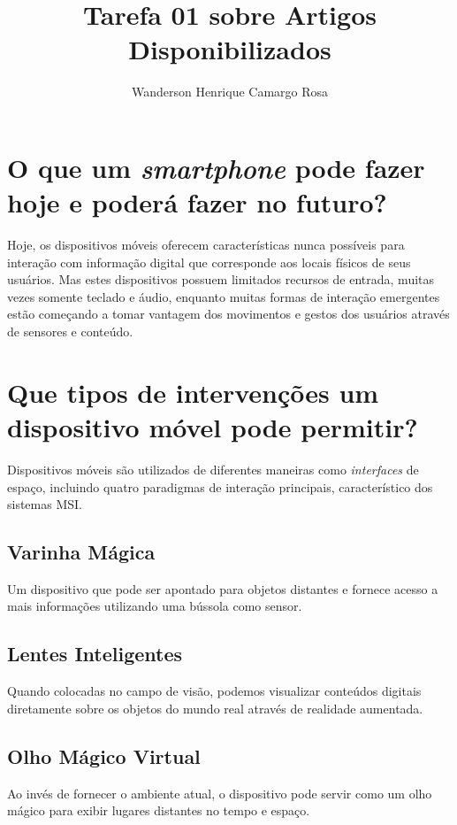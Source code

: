 \documentclass{article}
\title{Tarefa 01 sobre Artigos Disponibilizados}
\author{Wanderson Henrique Camargo Rosa\inst{1}}
\begin{document}
\maketitle{}

\section{O que um \emph{smartphone} pode fazer hoje e poderá fazer no futuro?}

Hoje, os dispositivos móveis oferecem características nunca possíveis para
interação com informação digital que corresponde aos locais físicos de seus
usuários. Mas estes dispositivos possuem limitados recursos de entrada, muitas
vezes somente teclado e áudio, enquanto muitas formas de interação emergentes
estão começando a tomar vantagem dos movimentos e gestos dos usuários através de
sensores e conteúdo.

\section{Que tipos de intervenções um dispositivo móvel pode permitir?}

Dispositivos móveis são utilizados de diferentes maneiras como \emph{interfaces}
de espaço, incluindo quatro paradigmas de interação principais, característico
dos sistemas MSI.

\subsection{Varinha Mágica}

Um dispositivo que pode ser apontado para objetos distantes e fornece acesso a
mais informações utilizando uma bússola como sensor.

\subsection{Lentes Inteligentes}

Quando colocadas no campo de visão, podemos visualizar conteúdos digitais
diretamente sobre os objetos do mundo real através de realidade aumentada.

\subsection{Olho Mágico Virtual}

Ao invés de fornecer o ambiente atual, o dispositivo pode servir como um olho
mágico para exibir lugares distantes no tempo e espaço.
\end{document}
